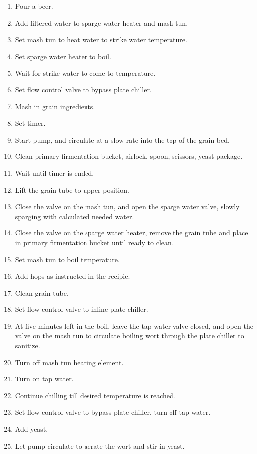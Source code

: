 \begin{enumerate}
    \item Pour a beer.
    \item Add filtered water to sparge water heater and mash tun.
    \item Set mash tun to heat water to strike water temperature.
    \item Set sparge water heater to boil.
    \item Wait for strike water to come to temperature.
    \item Set flow control valve to bypass plate chiller.
    \item Mash in grain ingredients.
    \item Set timer.
    \item Start pump, and circulate at a slow rate into the top of the grain bed.
    \item Clean primary firmentation bucket, airlock, spoon, scissors, yeast package.
    \item Wait until timer is ended.
    \item Lift the grain tube to upper position.
    \item Close the valve on the mash tun, and open the sparge water valve, slowly sparging with  calculated needed water.
    \item Close the valve on the sparge water heater, remove the grain tube and place in primary firmentation bucket until ready to clean.
    \item Set mash tun to boil temperature.
    \item Add hops as instructed in the recipie.
    \item Clean grain tube.
    \item Set flow control valve to inline plate chiller.
    \item At five minutes left in the boil, leave the tap water valve closed, and open the valve on the mash tun to circulate boiling wort through the plate chiller to sanitize.
    \item Turn off mash tun heating element.
    \item Turn on tap water.
    \item Continue chilling till desired temperature is reached.
    \item Set flow control valve to bypass plate chiller, turn off tap water.
    \item Add yeast.
    \item Let pump circulate to aerate the wort and stir in yeast.

\end{enumerate}

